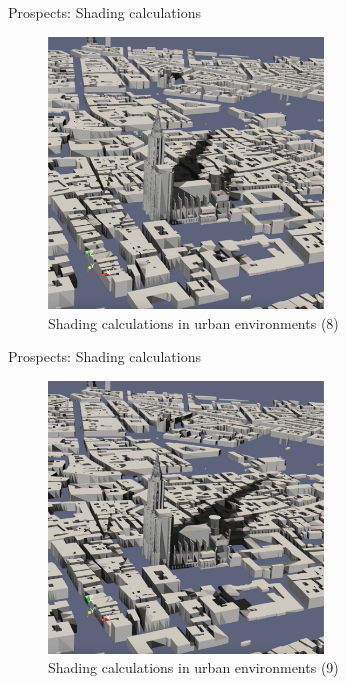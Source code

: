 \documentclass[10pt]{beamer}
\begin{document}
\begin{frame}{Prospects: Shading calculations}
  \begin{figure}
      \centering
      \includegraphics[width=0.65\textwidth]{images/shading-8.png}
      \caption{Shading calculations in urban environments (8)}
  \end{figure}
\end{frame}

\begin{frame}{Prospects: Shading calculations}
  \begin{figure}
      \centering
      \includegraphics[width=0.65\textwidth]{images/shading-9.png}
      \caption{Shading calculations in urban environments (9)}
  \end{figure}
\end{frame}
\end{document}
